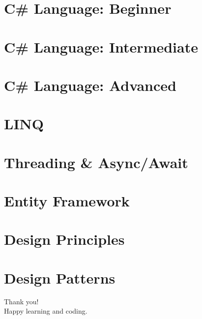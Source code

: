 \documentclass{mybeamer}
\begin{document}
\hypertarget{sec1}{}
\section{C\# Language: Beginner}


\hypertarget{sec2}{}
\section{C\# Language: Intermediate}


\hypertarget{sec3}{}
\section{C\# Language: Advanced}


\hypertarget{sec4}{}
\section{LINQ}


\hypertarget{sec5}{}
\section{Threading \& Async/Await}


\hypertarget{sec6}{}
\section{Entity Framework}


\hypertarget{sec7}{}
\section{Design Principles}


\hypertarget{sec8}{}
\section{Design Patterns}


\begin{frame}
  \centering
  {\Huge Thank you!}\\[0.5em]
  Happy learning and coding.
\end{frame}
\end{document}
